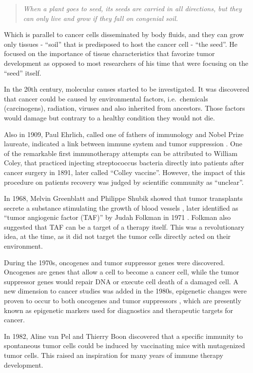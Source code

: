 \documentclass[12pt,]{book}
\theoremstyle{definition}
\theoremstyle{definition}
\theoremstyle{definition}
\theoremstyle{remark}
\begin{document}
\begin{quote}
\emph{When a plant goes to seed, its seeds are carried in all
directions, but they can only live and grow if they fall on congenial
soil.}
\end{quote}

Which is parallel to cancer cells disseminated by body fluids, and they
can grow only tissues - ``soil'' that is predisposed to host the cancer
cell - ``the seed''. He focused on the importance of tissue
characteristics that favorize tumor development as opposed to most
researchers of his time that were focusing on the ``seed'' itself.

In the 20th century, molecular causes started to be investigated. It was
discovered that cancer could be caused by environmental factors,
i.e.~chemicals (carcinogens), radiation, viruses and also inherited from
ancestors. Those factors would damage but contrary to a healthy
condition they would not die.

Also in 1909, Paul Ehrlich, called one of fathers of immunology and
Nobel Prize laureate, indicated a link between immune system and tumor
suppression \citep{Ehrlich1909}. One of the remarkable first
immunotherapy attempts can be attributed to William Coley, that
practiced injecting streptococcus bacteria directly into patients after
cancer surgery in 1891, later called ``Colley vaccine''. However, the
impact of this procedure on patients recovery was judged by scientific
community as ``unclear''.

In 1968, Melvin Greenblatt and Philippe Shubik showed that tumor
transplants secrete a substance stimulating the growth of blood vessels
\citep{Greenblatt1968}, later identified as ``tumor angiogenic factor
(TAF)'' by Judah Folkman in 1971 \citep{Folkman1971}. Folkman also
suggested that TAF can be a target of a therapy itself. This was a
revolutionary idea, at the time, as it did not target the tumor cells
directly acted on their environment.

During the 1970s, oncogenes and tumor suppressor genes were discovered.
Oncogenes are genes that allow a cell to become a cancer cell, while the
tumor suppressor genes would repair DNA or execute cell death of a
damaged cell. A new dimension to cancer studies was added in the 1980s,
epigenetic changes were proven to occur to both oncogenes and tumor
suppressors \citep{Feinberg1983, Greger1989}, which are presently known
as epigenetic markers used for diagnostics and therapeutic targets for
cancer.

In 1982, Aline van Pel and Thierry Boon \citep{VanPel1982} discovered
that a specific immunity to spontaneous tumor cells could be induced by
vaccinating mice with mutagenized tumor cells. This raised an
inspiration for many years of immune therapy development.
\end{document}
